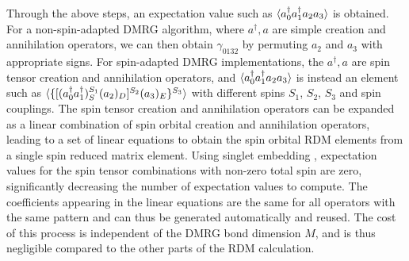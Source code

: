 Through the above steps, an expectation value such as $\braket{{a}^\dagger_0{a}^\dagger_1{a}_2{a}_3}$ is obtained. 
For a non-spin-adapted DMRG algorithm, where $a^\dag, a$ are simple creation and annihilation operators, 
we can then obtain $\gamma_{0132}$ by permuting $ {a}_2$ and ${a}_3$ with appropriate signs. For spin-adapted DMRG implementations, the $a^\dag, a$ 
are spin tensor creation and annihilation operators, and
$\braket{{a}^\dagger_0{a}^\dagger_1{a}_2{a}_3}$ is instead an element such as
$\braket{\{[({a}^\dagger_0{a}^\dagger_1)^{S_1}_{S}({a}_2)_{D}]^{S_2}({a}_3)_{E}\}^{S_3}}$ with different spins $S_1$, $S_2$, $S_3$ and spin couplings. 
The spin tensor creation and annihilation operators can be expanded as a linear combination of spin orbital creation
and annihilation operators, leading to a set of linear equations to obtain the spin orbital RDM elements from a single spin reduced matrix element. Using singlet embedding \cite{tatsuaki_interaction-round--face_2000, sharma_spin-adapted_2012}, expectation values for the spin tensor combinations with non-zero total spin are zero, significantly decreasing the number of 
expectation values to compute. The coefficients appearing in the linear equations are the same for all operators with the same pattern and can thus be generated 
automatically and reused. The cost of this process is independent of the DMRG bond dimension $M$, and is thus negligible compared to the other parts of the RDM calculation.


